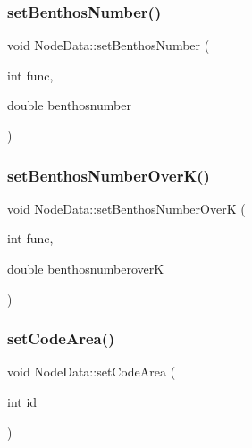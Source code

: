 \mbox{\label{class_node_data_a858944519250709f8f13244947067fb9}} 
\subsubsection{\texorpdfstring{setBenthosNumber()}{setBenthosNumber()}\hspace{0.1cm}{\footnotesize\ttfamily [2/2]}}
{\footnotesize\ttfamily void Node\+Data\+::set\+Benthos\+Number (\begin{DoxyParamCaption}\item[{int}]{func,  }\item[{double}]{benthosnumber }\end{DoxyParamCaption})}

\mbox{\label{class_node_data_ae740bb9dcafae45bcd5bd3f00d592c0e}} 
\subsubsection{\texorpdfstring{setBenthosNumberOverK()}{setBenthosNumberOverK()}}
{\footnotesize\ttfamily void Node\+Data\+::set\+Benthos\+Number\+OverK (\begin{DoxyParamCaption}\item[{int}]{func,  }\item[{double}]{benthosnumberoverK }\end{DoxyParamCaption})}

\mbox{\label{class_node_data_a2e935f0c3eab83e69d46561a157b02aa}} 
\subsubsection{\texorpdfstring{setCodeArea()}{setCodeArea()}}
{\footnotesize\ttfamily void Node\+Data\+::set\+Code\+Area (\begin{DoxyParamCaption}\item[{int}]{id }\end{DoxyParamCaption})\hspace{0.3cm}{\ttfamily [inline]}}

